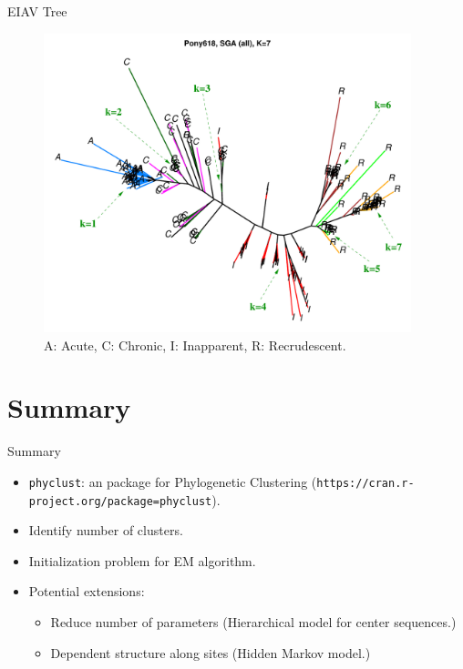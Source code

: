 \documentclass{beamer}
\begin{document}

\begin{frame}{EIAV Tree}

\begin{center}
\vspace{-0.5cm}
\begin{figure}
\hspace{-1.0cm}
  \includegraphics[width=4.2in]{./graph/SGA_tree_K=7}
  \\
  \vspace{-0.5cm}
  {\tiny A: Acute, C: Chronic, I: Inapparent, R: Recrudescent.}
\end{figure}
\end{center}

\end{frame}


\section{Summary}

\begin{frame}{Summary}

\begin{itemize}
\item {\tt phyclust}: an \R package for Phylogenetic Clustering
      ({\tt https://cran.r-project.org/package=phyclust}).
\item Identify number of clusters.
\item Initialization problem for EM algorithm.
\item Potential extensions:
\begin{itemize}
\item Reduce number of parameters (Hierarchical model for center sequences.)
\item Dependent structure along sites (Hidden Markov model.)
\end{itemize}
\end{itemize}

\end{frame}
\end{document}
